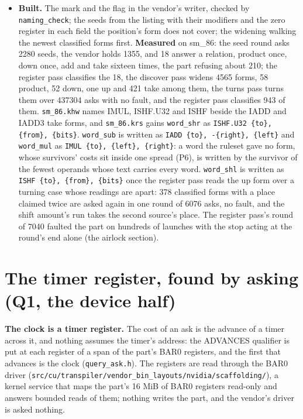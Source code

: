 \begin{itemize}
\item \textbf{Built.} The mark and the flag in the vendor's writer, checked by \texttt{naming\_\allowbreak{}check}; the seeds from the listing with their modifiers and the zero register in each field the position's form does not cover; the widening walking the newest classified forms first. \textbf{Measured} on sm\_\allowbreak{}86: the seed round asks 2280 seeds, the vendor holds 1355, and 18 answer a relation, product once, down once, add and take sixteen times, the part refusing about 210; the register pass classifies the 18, the discover pass widens 4565 forms, 58 product, 52 down, one up and 421 take among them, the turns pass turns them over 437304 asks with no fault, and the register pass classifies 943 of them. \texttt{sm\_\allowbreak{}86.\allowbreak{}khw} names IMUL, ISHF.U32 and ISHF beside the IADD and IADD3 take forms, and \texttt{sm\_\allowbreak{}86.\allowbreak{}krs} gains \texttt{word\_\allowbreak{}shr} as \texttt{ISHF.\allowbreak{}U32 \{to\}, \{from\}, \{bits\}}. \texttt{word\_\allowbreak{}sub} is written as \texttt{IADD \{to\}, -\allowbreak{}\{right\}, \{left\}} and \texttt{word\_\allowbreak{}mul} as \texttt{IMUL \{to\}, \{left\}, \{right\}}: a word the ruleset gave no form, whose survivors' costs sit inside one spread (P6), is written by the survivor of the fewest operands whose text carries every word. \texttt{word\_\allowbreak{}shl} is written as \texttt{ISHF \{to\}, \{from\}, \{bits\}} once the register pass reads the up form over a turning case whose readings are apart: 378 classified forms with a place claimed twice are asked again in one round of 6076 asks, no fault, and the shift amount's run takes the second source's place. The register pass's round of 7040 faulted the part on hundreds of launches with the stop acting at the round's end alone (the airlock section).
\end{itemize}

\section{\texorpdfstring{The timer register, found by asking (Q1, the device half)}{The timer register, found by asking (Q1, the device half)}}

\textbf{The clock is a timer register.} The cost of an ask is the advance of a timer across it, and nothing assumes the timer's address: the ADVANCES qualifier is put at each register of a span of the part's BAR0 registers, and the first that advances is the clock (\texttt{query\_\allowbreak{}ask.\allowbreak{}h}). The registers are read through the BAR0 driver (\texttt{src/\allowbreak{}cu/\allowbreak{}transpiler/\allowbreak{}vendor\_\allowbreak{}bin\_\allowbreak{}layouts/\allowbreak{}nvidia/\allowbreak{}scaffolding/\allowbreak{}}), a kernel service that maps the part's 16 MiB of BAR0 registers read-only and answers bounded reads of them; nothing writes the part, and the vendor's driver is asked nothing.

